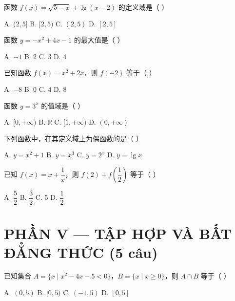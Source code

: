 \documentclass[11pt, a4paper]{article}
\begin{document}
\begin{baitap}[26]
函数 $f(x) = \sqrt{5 - x} + \lg(x - 2)$ 的定义域是（ ）
\par\vspace{3pt}
\noindent A. $(2, 5]$ \quad B. $[2, 5)$ \quad C. $(2, 5)$ \quad D. $[2, 5]$
\end{baitap}

\begin{baitap}[27]
函数 $y = -x^2 + 4x - 1$ 的最大值是（ ）
\par\vspace{3pt}
\noindent A. $-1$ \quad B. $2$ \quad C. $3$ \quad D. $4$
\end{baitap}

\begin{baitap}[28]
已知函数 $f(x) = x^2 + 2x$，则 $f(-2)$ 等于（ ）
\par\vspace{3pt}
\noindent A. $-8$ \quad B. $0$ \quad C. $4$ \quad D. $8$
\end{baitap}

\begin{baitap}[29]
函数 $y = 3^x$ 的值域是（ ）
\par\vspace{3pt}
\noindent A. $[0, +\infty)$ \quad B. $\mathbb{R}$ \quad C. $[1, +\infty)$ \quad D. $(0, +\infty)$
\end{baitap}

\begin{baitap}[30]
下列函数中，在其定义域上为偶函数的是（ ）
\par\vspace{3pt}
\noindent A. $y = x^2 + 1$ \quad B. $y = x^3$ \quad C. $y = 2^x$ \quad D. $y = \lg x$
\end{baitap}

\begin{baitap}[31]
已知 $f(x) = x + \dfrac{1}{x}$，则 $f(2) + f\!\left(\dfrac{1}{2}\right)$ 等于（ ）
\par\vspace{3pt}
\noindent A. $\dfrac{5}{2}$ \quad B. $\dfrac{3}{2}$ \quad C. $5$ \quad D. $\dfrac{1}{2}$
\end{baitap}

\section{PHẦN V — TẬP HỢP VÀ BẤT ĐẲNG THỨC (5 câu)}

\begin{baitap}[32]
已知集合 $A = \{x \mid x^2 - 4x - 5 < 0\}$，$B = \{x \mid x \ge 0\}$，则 $A \cap B$ 等于（ ）
\par\vspace{3pt}
\noindent A. $(0, 5)$ \quad B. $[0, 5)$ \quad C. $(-1, 5)$ \quad D. $[0, 5]$
\end{baitap}
\end{document}
